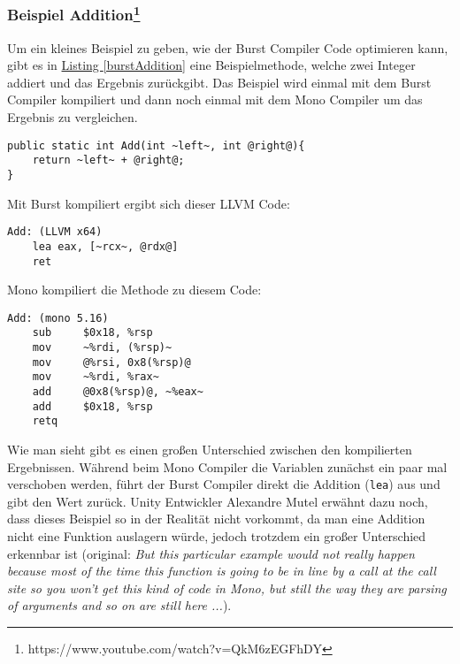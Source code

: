 \subsubsection{Beispiel Addition\footnote{https://www.youtube.com/watch?v=QkM6zEGFhDY}}
Um ein kleines Beispiel zu geben, wie der Burst Compiler Code optimieren kann, gibt es in \hyperref[burstAddition]{Listing \ref*{burstAddition}} eine Beispielmethode, welche zwei Integer addiert und das Ergebnis zurückgibt. Das Beispiel wird einmal mit dem Burst Compiler kompiliert und dann noch einmal mit dem Mono Compiler um das Ergebnis zu vergleichen.
\begin{lstlisting}[style=code, caption={Beispiel Addition Burst}, label = burstAddition]
public static int Add(int ~left~, int @right@){
	return ~left~ + @right@;
}
\end{lstlisting}
Mit Burst kompiliert ergibt sich dieser LLVM Code:
\begin{lstlisting}[style=code, caption={Addition Burst kompiliert}]
Add: (LLVM x64)
	lea eax, [~rcx~, @rdx@]
	ret
\end{lstlisting}
Mono kompiliert die Methode zu diesem Code:
\begin{lstlisting}[style=code, caption={Addition Mono kompiliert}]
Add: (mono 5.16)
	sub		$0x18, %rsp
	mov		~%rdi, (%rsp)~
	mov 	@%rsi, 0x8(%rsp)@
	mov 	~%rdi, %rax~
	add 	@0x8(%rsp)@, ~%eax~
	add 	$0x18, %rsp
	retq
\end{lstlisting}
Wie man sieht gibt es einen großen Unterschied zwischen den kompilierten Ergebnissen. Während beim Mono Compiler die Variablen zunächst ein paar mal verschoben werden, führt der Burst Compiler direkt die Addition (\texttt{lea}) aus und gibt den Wert zurück. Unity Entwickler Alexandre Mutel erwähnt dazu noch, dass dieses Beispiel so in der Realität nicht vorkommt, da man eine Addition nicht eine Funktion auslagern würde, jedoch trotzdem ein großer Unterschied erkennbar ist (original: \textit{But this particular example would not really happen because most of the time this function is going to be in line by a call at the call site so you won't get this kind of code in Mono, but still the way they are parsing of arguments and so on are still here ...})\cite{Burst-Unite_LA}.
